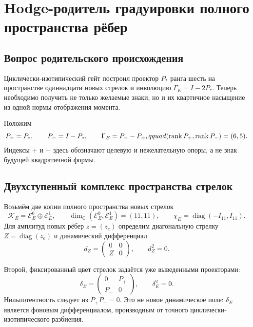 \chapter{Hodge-родитель градуировки полного пространства рёбер}
\label{ch:v7-edge-grading-hodge-superconnection-parent-gate}

\section{Вопрос родительского происхождения}

Циклически-изотипический гейт построил проектор $P_*$ ранга шесть на
пространстве одиннадцати новых стрелок и инволюцию
$\Gamma_E=I-2P_*$. Теперь необходимо получить не только желаемые знаки, но
и их квартичное насыщение из одной нормы отображения момента.

Положим
\begin{equation}
 P_+=P_*,\qquad P_-=I-P_*,\qquad
 \Gamma_E=P_--P_+,qquad
 (\operatorname{rank} P_+,\operatorname{rank} P_-)=(6,5).
 \label{eq:v7-edge-hodge-projectors}
\end{equation}
Индексы $+$ и $-$ здесь обозначают целевую и нежелательную опоры, а не
знак будущей квадратичной формы.

\section{Двухступенный комплекс пространства стрелок}

Возьмём две копии полного пространства новых стрелок
\begin{equation}
 \mathcal K_E=\mathcal E_E^0\oplus\mathcal E_E^1,
 \qquad
 \dim_{\mathbb C}(\mathcal E_E^0,\mathcal E_E^1)=(11,11),
 \qquad
 \chi_E=\operatorname{diag}(-I_{11},I_{11}).
 \label{eq:v7-edge-hodge-two-term-carrier}
\end{equation}
Для амплитуд новых рёбер $z=(z_e)$ определим диагональную стрелку
$Z=\operatorname{diag}(z_e)$ и динамический дифференциал
\begin{equation}
 d_Z=\begin{pmatrix}0&0\\Z&0\end{pmatrix},
 \qquad d_Z^2=0.
 \label{eq:v7-edge-hodge-dynamic-differential}
\end{equation}

Второй, фиксированный цвет стрелок задаётся уже выведенными проекторами:
\begin{equation}
 \delta_E=\begin{pmatrix}0&P_+\\P_-&0\end{pmatrix},
 \qquad \delta_E^2=0.
 \label{eq:v7-edge-hodge-background-differential}
\end{equation}
Нильпотентность следует из $P_+P_-=0$. Это не новое динамическое поле:
$\delta_E$ является фоновым дифференциалом, производным от точного
циклически-изотипического разбиения.

